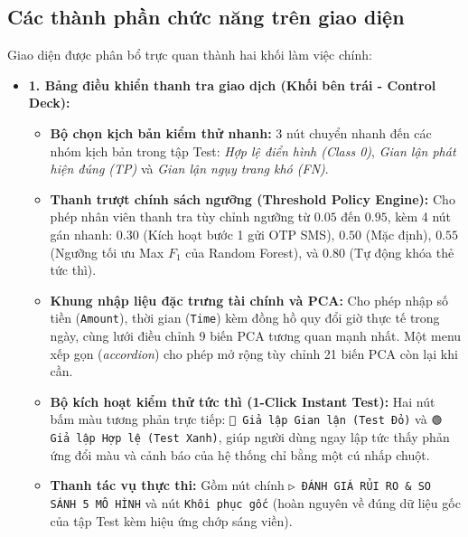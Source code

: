 \documentclass[13pt,a4paper]{extarticle}
\begin{document}
\subsection{Các thành phần chức năng trên giao diện}
Giao diện được phân bổ trực quan thành hai khối làm việc chính:
\begin{itemize}
    \item \textbf{1. Bảng điều khiển thanh tra giao dịch (Khối bên trái - Control Deck):}
    \begin{itemize}
        \item \textbf{Bộ chọn kịch bản kiểm thử nhanh:} 3 nút chuyển nhanh đến các nhóm kịch bản trong tập Test: \textit{Hợp lệ điển hình (Class 0)}, \textit{Gian lận phát hiện đúng (TP)} và \textit{Gian lận ngụy trang khó (FN)}.
        \item \textbf{Thanh trượt chính sách ngưỡng (Threshold Policy Engine):} Cho phép nhân viên thanh tra tùy chỉnh ngưỡng từ $0.05$ đến $0.95$, kèm 4 nút gán nhanh: $0.30$ (Kích hoạt bước 1 gửi OTP SMS), $0.50$ (Mặc định), $0.55$ (Ngưỡng tối ưu Max $F_1$ của Random Forest), và $0.80$ (Tự động khóa thẻ tức thì).
        \item \textbf{Khung nhập liệu đặc trưng tài chính và PCA:} Cho phép nhập số tiền (\texttt{Amount}), thời gian (\texttt{Time}) kèm đồng hồ quy đổi giờ thực tế trong ngày, cùng lưới điều chỉnh 9 biến PCA tương quan mạnh nhất. Một menu xếp gọn (\textit{accordion}) cho phép mở rộng tùy chỉnh 21 biến PCA còn lại khi cần.
        \item \textbf{Bộ kích hoạt kiểm thử tức thì (1-Click Instant Test):} Hai nút bấm màu tương phản trực tiếp: \texttt{🚨 Giả lập Gian lận (Test Đỏ)} và \texttt{🟢 Giả lập Hợp lệ (Test Xanh)}, giúp người dùng ngay lập tức thấy phản ứng đổi màu và cảnh báo của hệ thống chỉ bằng một cú nhấp chuột.
        \item \textbf{Thanh tác vụ thực thi:} Gồm nút chính \texttt{▷ ĐÁNH GIÁ RỦI RO \& SO SÁNH 5 MÔ HÌNH} và nút \texttt{Khôi phục gốc} (hoàn nguyên về đúng dữ liệu gốc của tập Test kèm hiệu ứng chớp sáng viền).
    \end{itemize}


\end{itemize}
\end{document}
